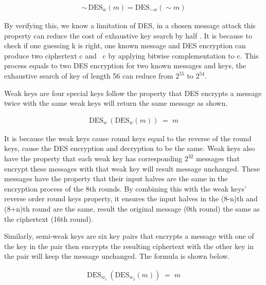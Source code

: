 \documentclass{article}
\begin{document}
\begin{equation*}
\begin{split}
   \sim \, \text{DES}_{w}(m) = \text{DES}_{\sim w}(\sim m)
\end{split}
\end{equation*}

By verifying this, we know a limitation of DES, in a chosen message attack
this property can reduce the cost of exhaustive key search by half \cite{DEScomplementationproperty}. It is because to check if one guessing k is right,
one known message and DES encryption can produce two ciphertext c and ~c by applying bitwise complementation to c. This process
equals to two DES encryption for two known messages and keys, the exhaustive search of key of length 56 can reduce from
$2^{55}$ to $2^{54}$.

Weak keys are four special keys follow the property that DES encrypts a message twice with the same weak keys will return
the same message as shown.

\begin{equation*}
\begin{split}
   \text{DES}_{w} \, (\text{DES}_{w}(m)) \;= \;m
\end{split}
\end{equation*}

It is because the weak keys cause round keys equal to  the reverse of
the round keys, cause the DES encryption and decryption to be the same. Weak keys also have the property that each weak key
has corresponding $2^{32}$ messages that encrypt these messages with that weak key will result message unchanged. These messages
have the property that their input halves are the same in the encryption process of the 8th rounds. By combining this with the weak keys' reverse
order round keys property, it ensures the input halves in the (8-n)th and (8+n)th round are the same, result the original message (0th round) the same
as the ciphertext (16th round).

Similarly, semi-weak keys are six key pairs that encrypts a message with one of the key in the pair then encrypts the resulting
ciphertext with the other key in the pair will keep the message unchanged. The formula is shown below.

\begin{equation*}
\begin{split}
   \text{DES}_{w_{1}} \, (\text{DES}_{w_{2}}(m)) \;= \;m
\end{split}
\end{equation*}
\end{document}
